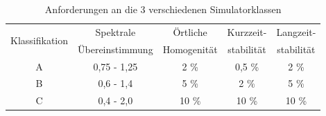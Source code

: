\documentclass[a4paper,bibtotoc,oneside]{scrbook}
\begin{document}
\begin{table}[htbp]
\centering
\begin{tabular}{ | c | c | c | c | c |}\hline
\multirow{2}{*}{Klassifikation} &  Spektrale  &  Örtliche  & {Kurzzeit-}& {Langzeit-}\\
& Übereinstimmung & Homogenität & {stabilität} & {stabilität} \\ 
\hline
\hline
A  & 0,75 - 1,25 & 2 \% & 0,5 \% & 2 \%\\ \hline
B  & 0,6 - 1,4 & 5 \% & 2 \% & 5 \%\\ \hline
C  & 0,4 - 2,0 & 10 \% & 10 \% & 10 \%\\ \hline

\end{tabular}
\caption{Anforderungen an die 3 verschiedenen Simulatorklassen}\label{TabS2}
\end{table}
\end{document}
